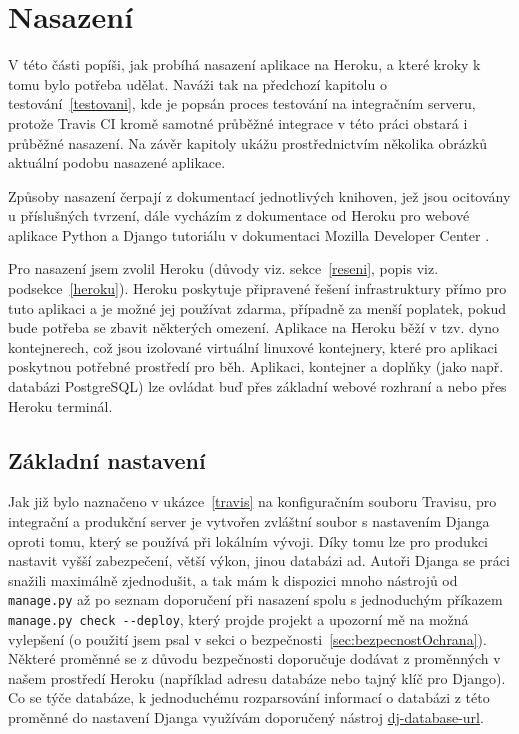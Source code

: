         
\chapter{Nasazení}\label{nasazeni}
    V této části popíši, jak probíhá nasazení aplikace na Heroku, a které kroky k tomu bylo potřeba udělat. Naváži tak na předchozí kapitolu o testování~\ref{testovani}, kde je popsán proces testování na integračním serveru, protože Travis CI kromě samotné průběžné integrace v této práci obstará i průběžné nasazení. Na závěr kapitoly ukážu prostřednictvím několika obrázků aktuální podobu nasazené aplikace.
    
    Způsoby nasazení čerpají z dokumentací jednotlivých knihoven, jež jsou ocitovány u příslušných tvrzení, dále vycházím z dokumentace od Heroku pro webové aplikace Python \cite{heroku-python} a Django tutoriálu v dokumentaci Mozilla Developer Center \cite{mdn-django}.
    
    Pro nasazení jsem zvolil Heroku (důvody viz. sekce~\ref{reseni}, popis viz. podsekce~\ref{heroku}). Heroku poskytuje připravené řešení infrastruktury přímo pro tuto aplikaci a je možné jej používat zdarma, případně za menší poplatek, pokud bude potřeba se zbavit některých omezení. Aplikace na Heroku běží v tzv. dyno kontejnerech, což jsou izolované virtuální linuxové kontejnery, které pro aplikaci poskytnou potřebné prostředí pro běh. Aplikaci, kontejner a doplňky (jako např. databázi PostgreSQL) lze ovládat buď přes základní webové rozhraní a nebo přes Heroku terminál.
    
    \section{Základní nastavení}\label{sec:zakladniNastaveni}
    Jak již bylo naznačeno v ukázce~\ref{travis} na konfiguračním souboru Travisu, pro integrační a produkční server je vytvořen zvláštní soubor s nastavením Djanga oproti tomu, který se používá při lokálním vývoji. Díky tomu lze pro produkci nastavit vyšší zabezpečení, větší výkon, jinou databázi ad. Autoři Djanga se práci snažili maximálně zjednodušit, a tak mám k dispozici mnoho nástrojů od \verb|manage.py| až po seznam doporučení při nasazení \cite{django-checklist} spolu s jednoduchým příkazem \verb|manage.py check --deploy|, který projde projekt a upozorní mě na možná vylepšení (o použití jsem psal v sekci o bezpečnosti~\ref{sec:bezpecnostOchrana}). Některé proměnné se z důvodu bezpečnosti doporučuje dodávat z proměnných v našem prostředí Heroku (například adresu databáze nebo tajný klíč pro Django). Co se týče databáze, k jednoduchému rozparsování informací o databázi z této proměnné do nastavení Djanga využívám doporučený nástroj \href{https://github.com/kennethreitz/dj-database-url}{dj-database-url}.
    
